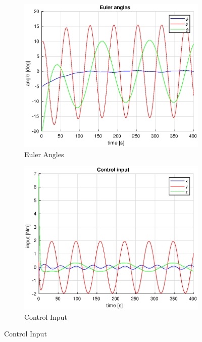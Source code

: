 \begin{figure}[h]
    \centering
    \begin{subfigure}[b]{0.45\textwidth}
        \includegraphics[width=\textwidth]{plots/euler_angles_16.eps}
        \caption{Euler Angles}
        \label{fig:euler6}
    \end{subfigure}
    \begin{subfigure}[b]{0.45\textwidth}
        \includegraphics[width=\textwidth]{plots/control_input_16.eps}
        \caption{Control Input}
        \label{fig:input6}
    \end{subfigure}

\end{figure}

